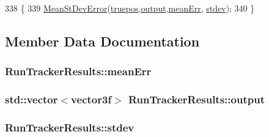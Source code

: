 \begin{DoxyCode}
338                         \{
339         \hyperlink{_shared_tests_8h_a771630e2d9a64612a46d3ae9722174de}{MeanStDevError}(\hyperlink{struct_run_tracker_results_a3dea14e81b2d19737fbb8037e5416dfd}{truepos},\hyperlink{struct_run_tracker_results_a60eded57e24f569a9f09647eb85242bb}{output},\hyperlink{struct_run_tracker_results_aa54cf183d9405dec524ea3fbc9175763}{meanErr},
      \hyperlink{struct_run_tracker_results_a655e8e8fc33c59f9341ea0fc8979fec6}{stdev});
340     \}
\end{DoxyCode}


\subsection{Member Data Documentation}
\subsubsection[{\texorpdfstring{mean\+Err}{meanErr}}]{ Run\+Tracker\+Results\+::mean\+Err}\hypertarget{struct_run_tracker_results_aa54cf183d9405dec524ea3fbc9175763}{}\label{struct_run_tracker_results_aa54cf183d9405dec524ea3fbc9175763}
\subsubsection[{\texorpdfstring{output}{output}}]{\setlength{\rightskip}{0pt plus 5cm}std\+::vector$<${\bf vector3f}$>$ Run\+Tracker\+Results\+::output}\hypertarget{struct_run_tracker_results_a60eded57e24f569a9f09647eb85242bb}{}\label{struct_run_tracker_results_a60eded57e24f569a9f09647eb85242bb}
\subsubsection[{\texorpdfstring{stdev}{stdev}}]{ Run\+Tracker\+Results\+::stdev}\hypertarget{struct_run_tracker_results_a655e8e8fc33c59f9341ea0fc8979fec6}{}\label{struct_run_tracker_results_a655e8e8fc33c59f9341ea0fc8979fec6}
